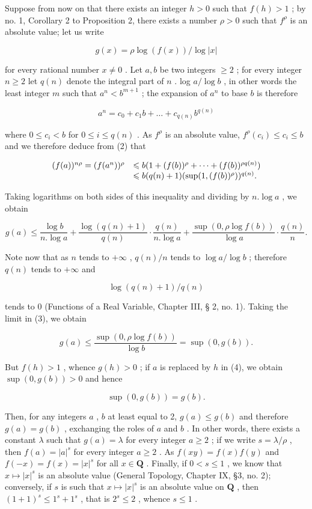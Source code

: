 Suppose from now on that there exists an integer \(h > 0\) such that \(f(h) > 1\) ; by no. 1, Corollary 2 to Proposition 2, there exists a number \(\rho > 0\) such that \(f^{\rho}\) is an absolute value; let us write

\[
g (x) = \rho \log (f (x)) / \log | x |
\]

for every rational number \(x \neq 0\) . Let \(a, b\) be two integers \(\geqslant 2\) ; for every integer \(n \geqslant 2\) let \(q(n)\) denote the integral part of \(n\) . log \(a / \log b\) , in other words the least integer \(m\) such that \(a^n < b^{m+1}\) ; the expansion of \(a^n\) to base \(b\) is therefore

\[
a ^ {n} = c _ {0} + c _ {1} b + \dots + c _ {q (n)} b ^ {q (n)}\tag{2}
\]

where \(0 \leqslant c_{i} < b\) for \(0 \leqslant i \leqslant q(n)\) . As \(f^{\rho}\) is an absolute value, \(f^{\rho}(c_{i}) \leqslant c_{i} \leqslant b\) and we therefore deduce from (2) that

\[
\begin{array}{r l} (f (a)) ^ {n \rho} = (f (a ^ {n})) ^ {\rho} & \leqslant b (1 + (f (b)) ^ {\rho} + \dots + (f (b)) ^ {\rho q (n)}) \\ & \leqslant b (q (n) + 1) (\sup (1, (f (b)) ^ {\rho})) ^ {q (n)}. \end{array}
\]

Taking logarithms on both sides of this inequality and dividing by \(n.\log a\) , we obtain

\[
g (a) \leqslant \frac {\log b}{n . \log a} + \frac {\log (q (n) + 1)}{q (n)} \cdot \frac {q (n)}{n . \log a} + \frac {\sup (0 , \rho \log f (b))}{\log a} \cdot \frac {q (n)}{n}.\tag{3}
\]

Note now that as \(n\) tends to \(+\infty\) , \(q(n) / n\) tends to \(\log a / \log b\) ; therefore \(q(n)\) tends to \(+\infty\) and

\[
\log (q (n) + 1) / q (n)
\]

tends to 0 (Functions of a Real Variable, Chapter III, § 2, no. 1). Taking the limit in (3), we obtain

\[
g (a) \leqslant \frac {\sup (0 , \rho \log f (b))}{\log b} = \sup (0, g (b)).\tag{4}
\]

But \(f(h) > 1\) , whence \(g(h) > 0\) ; if \(a\) is replaced by \(h\) in (4), we obtain \(\sup(0, g(b)) > 0\) and hence

\[
\sup (0, g (b)) = g (b).
\]

Then, for any integers \(a\) , \(b\) at least equal to 2, \(g(a) \leqslant g(b)\) and therefore \(g(a) = g(b)\) , exchanging the roles of \(a\) and \(b\) . In other words, there exists a constant \(\lambda\) such that \(g(a) = \lambda\) for every integer \(a \geqslant 2\) ; if we write \(s = \lambda / \rho\) , then \(f(a) = |a|^s\) for every integer \(a \geqslant 2\) . As \(f(xy) = f(x)f(y)\) and \(f(-x) = f(x) = |x|^s\) for all \(x \in \mathbf{Q}\) . Finally, if \(0 < s \leqslant 1\) , we know that \(x \mapsto |x|^s\) is an absolute value (General Topology, Chapter IX, §3, no. 2); conversely, if \(s\) is such that \(x \mapsto |x|^s\) is an absolute value on \(\mathbf{Q}\) , then \((1 + 1)^s \leqslant 1^s + 1^s\) , that is \(2^s \leqslant 2\) , whence \(s \leqslant 1\) .

